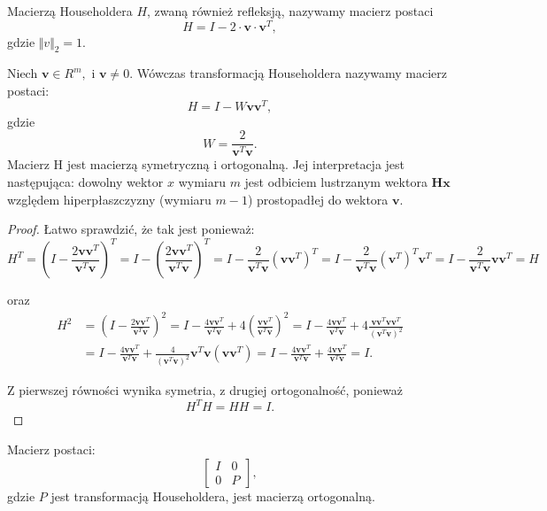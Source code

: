 \documentclass[12pt,a4paper]{report}
\newcommand{\vr}[1]{\mathbf{#1}}
\newcommand{\mx}[1]{{#1}}
\begin{document}
\begin{definition}
Macierzą Householdera $H$, zwaną również refleksją, nazywamy macierz postaci 
$$
\mx{H}=\mx{I}-2\cdot \vr{v}\cdot \vr{v}^{T},
$$
gdzie $\Vert v \Vert_{2} = 1$.
\end{definition}

\begin{theorem} 
Niech  $\vr{v}\in R^{m}, $ i $\vr{v}\neq 0. $ Wówczas transformacją Householdera nazywamy macierz postaci:
$$
\mx{H}=\mx{I}-W\vr{v}\vr{v}^{T},
$$
gdzie
$$
W={\frac {2}{\vr{v}^{T}\vr{v}}}.
$$ 
Macierz H jest macierzą symetryczną i ortogonalną. 
Jej interpretacja jest następująca: dowolny wektor $x$ wymiaru $m$ jest odbiciem lustrzanym wektora $\vr{Hx}$ względem hiperpłaszczyzny (wymiaru $m-1$) prostopadłej do wektora $\vr{v}$.
\end{theorem} 

\begin{proof}
Łatwo sprawdzić, że tak jest ponieważ: 
$$
\mx{H}^{T}=\left(\mx{I}-{\frac {2\vr{v}\vr{v}^{T}}{\vr{v}^{T}\vr{v}}}\right)^{T}
= \mx{I}-\left({\frac {2\vr{v}\vr{v}^{T}}{\vr{v}^{T}\vr{v}}}\right)^{T}
= \mx{I}-\frac {2}{\vr{v}^{T}\vr{v}} (\vr{v}\vr{v}^{T})^{T}
= \mx{I}-\frac {2}{\vr{v}^{T}\vr{v}} (\vr{v}^{T})^{T} \vr{v}^{T}
= \mx{I} - \frac{2}{\vr{v}^{T}\vr{v}} \vr{v}\vr{v}^{T} 
= \mx{H}
$$

oraz
\begin{align*}
\mx{H}^{2}  &=\left(\mx{I}-{\frac {2\vr{v}\vr{v}^{T}}{\vr{v}^{T}\vr{v}}}\right)^{2}  
= \mx{I}-{\frac {4\vr{v}\vr{v}^{T}}{\vr{v}^{T}\vr{v}}}+4\left({\frac {\vr{v}\vr{v}^{T}}{\vr{v}^{T}\vr{v}}}\right)^{2}  
=\mx{I} - \frac{4\vr{v}\vr{v}^{T}}{\vr{v}^{T}\vr{v}} + 4 \frac{\vr{v}\vr{v}^{T}\vr{v}\vr{v}^{T}}{(\vr{v}^{T}\vr{v})^{2}} \\
&=  \mx{I} - \frac{4\vr{v}\vr{v}^{T}}{\vr{v}^{T}\vr{v}} +  \frac{4}{(\vr{v}^{T}\vr{v})^{2}} \vr{v}^{T}\vr{v}(\vr{v}\vr{v}^{T})  
= \mx{I} - \frac{4\vr{v}\vr{v}^{T}}{\vr{v}^{T}\vr{v}} +  \frac{4\vr{v}\vr{v}^{T}}{\vr{v}^{T}\vr{v}}  = \mx{I}.
\end{align*}



Z pierwszej równości wynika symetria, z drugiej ortogonalność, ponieważ 
$$
\mx{H}^{T}\mx{H}=\mx{H}\mx{H}=\mx{I}.
$$ 
\end{proof} 

\begin{proposition}
Macierz postaci:
$$
\left[ 
\begin{array}{c|c}
I & 0 \\\hline
0 & P
\end{array}
\right],
$$
gdzie $\mx{P}$ jest transformacją Householdera, jest macierzą ortogonalną.
\end{proposition}
\end{document}
